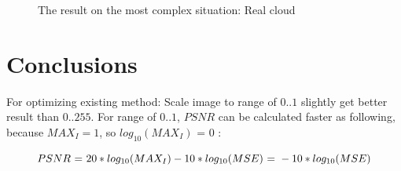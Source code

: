 \begin{figure}[]
	\centering
	\centering
	\caption{The result on the most complex situation: Real cloud}
\end{figure}

\section{Conclusions}

For optimizing existing method: Scale image to range of $0..1$ slightly get better result than $0..255$. For range of $0..1$, $PSNR$ can be calculated faster as following, because $MAX_I = 1$, so $log_{10}(MAX_I) \textrm{ = } 0$ :

\begin{equation}
\centering
PSNR \textrm{ = } 20 * log_{10}(MAX_I) - 10 * log_{10}(MSE) \textrm{ = } -10 * log_{10}(MSE)
\end{equation}

